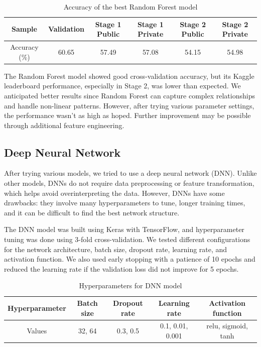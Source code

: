 \documentclass[11pt,a4paper]{article}
\begin{document}
\begin{table}[H]
  \centering
  \begin{tabular}{|c|c|c|c|c|c|}
  \hline
  Sample & Validation & Stage 1 Public & Stage 1 Private & Stage 2 Public & Stage 2 Private \\ \hline
  Accuracy (\%) & 60.65 & 57.49 & 57.08 & 54.15 & 54.98 \\ \hline
  \end{tabular}
  \caption{Accuracy of the best Random Forest model}
\end{table}

The Random Forest model showed good cross-validation accuracy, but its Kaggle leaderboard performance, especially in Stage 2, was lower than expected. We anticipated better results since Random Forest can capture complex relationships and handle non-linear patterns. However, after trying various parameter settings, the performance wasn't as high as hoped. Further improvement may be possible through additional feature engineering.










\subsection{Deep Neural Network}

After trying various models, we tried to use a deep neural network (DNN). Unlike other models, DNNs do not require data preprocessing or feature transformation, which helps avoid overinterpreting the data. However, DNNs have some drawbacks: they involve many hyperparameters to tune, longer training times, and it can be difficult to find the best network structure.

The DNN model was built using Keras with TensorFlow, and hyperparameter tuning was done using 3-fold cross-validation. We tested different configurations for the network architecture, batch size, dropout rate, learning rate, and activation function. We also used early stopping with a patience of 10 epochs and reduced the learning rate if the validation loss did not improve for 5 epochs.


\begin{table}[H]
  \centering
  \begin{tabular}{|c|c|c|c|c|}
  \hline
  Hyperparameter & Batch size & Dropout rate & Learning rate & Activation function \\ \hline
  Values & 32, 64 & 0.3, 0.5 & 0.1, 0.01, 0.001 & relu, sigmoid, tanh \\ \hline
  \end{tabular}
  \caption{Hyperparameters for DNN model}
\end{table}
\end{document}
